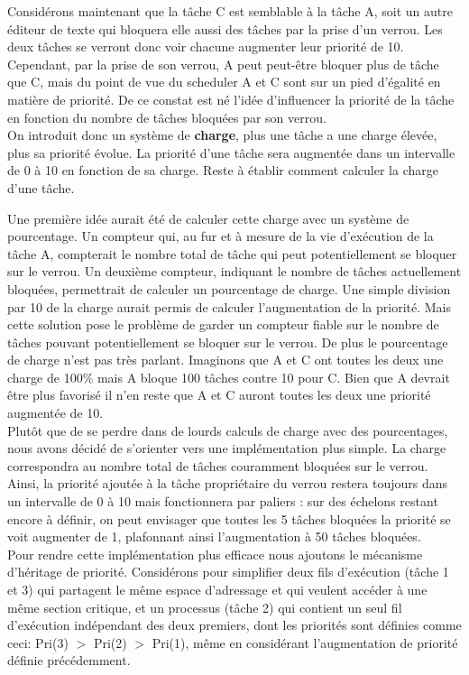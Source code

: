 Considérons maintenant que la tâche C est semblable à la tâche A, soit un autre éditeur de texte qui bloquera elle aussi des tâches par la prise d'un verrou. Les deux tâches se verront donc voir chacune augmenter leur priorité de 10. Cependant, par la prise de son verrou, A peut peut-être bloquer plus de tâche que C, mais du point de vue du scheduler A et C sont sur un pied d'égalité en matière de priorité. De ce constat est né l'idée d'influencer la priorité de la tâche en fonction du nombre de tâches bloquées par son verrou. 
\\

On introduit donc un système de \textbf{charge}, plus une tâche a une charge élevée, plus sa priorité évolue. La priorité d'une tâche sera augmentée dans un intervalle de 0 à 10 en fonction de sa charge. Reste à établir comment calculer la charge d'une tâche. 

Une première idée aurait été de calculer cette charge avec un système de pourcentage. Un compteur qui, au fur et à mesure de la vie d'exécution de la tâche A, compterait le nombre total de tâche qui peut potentiellement se bloquer sur le verrou. Un deuxième compteur, indiquant le nombre de tâches actuellement bloquées, permettrait de calculer un pourcentage de charge. Une simple division par 10 de la charge aurait permis de calculer l'augmentation de la priorité. Mais cette solution pose le problème de garder un compteur fiable sur le nombre de tâches pouvant potentiellement se bloquer sur le verrou. De plus le pourcentage de charge n'est pas très parlant. Imaginons que A et C ont toutes les deux une charge de 100\% mais A bloque 100 tâches contre 10 pour C. Bien que A devrait être plus favorisé il n'en reste que A et C auront toutes les deux une priorité augmentée de 10.
\\

Plutôt que de se perdre dans de lourds calculs de charge avec des pourcentages, nous avons décidé de s'orienter vers une implémentation plus simple. La charge correspondra au nombre total de tâches couramment bloquées sur le verrou. Ainsi, la priorité ajoutée à la tâche propriétaire du verrou restera toujours dans un intervalle de 0 à 10 mais fonctionnera par paliers : sur des échelons restant encore à définir, on peut envisager que toutes les 5 tâches bloquées la priorité se voit augmenter de 1, plafonnant ainsi l'augmentation à 50 tâches bloquées.
\\

Pour rendre cette implémentation plus efficace nous ajoutons le
mécanisme d'héritage de priorité. Considérons pour simplifier deux fils d'exécution
(tâche 1 et 3) qui partagent le même espace d'adressage et qui veulent accéder à une même section critique, et un processus (tâche 2) qui contient un seul fil d'exécution indépendant des deux 
premiers, dont les priorités sont définies comme ceci: Pri(3) $>$ Pri(2) $>$ 
Pri(1), même en considérant l'augmentation de priorité définie précédemment.
\\

